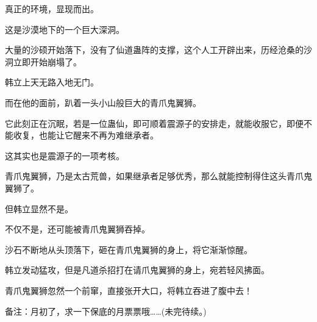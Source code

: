 \begin{this_body}
真正的环境，显现而出。

这是沙漠地下的一个巨大深洞。

大量的沙硕开始落下，没有了仙道蛊阵的支撑，这个人工开辟出来，历经沧桑的沙洞立即开始崩塌了。

韩立上天无路入地无门。

而在他的面前，趴着一头小山般巨大的青爪鬼翼狮。

它此刻正在沉眠，若是一位蛊仙，即可顺着震源子的安排走，就能收服它，即便不能收复，也能让它醒来不再为难继承者。

这其实也是震源子的一项考核。

青爪鬼翼狮，乃是太古荒兽，如果继承者足够优秀，那么就能控制得住这头青爪鬼翼狮了。

但韩立显然不是。

不仅不是，还可能被青爪鬼翼狮吞掉。

沙石不断地从头顶落下，砸在青爪鬼翼狮的身上，将它渐渐惊醒。

韩立发动猛攻，但是凡道杀招打在请爪鬼翼狮的身上，宛若轻风拂面。

青爪鬼翼狮忽然一个前窜，直接张开大口，将韩立吞进了腹中去！

备注：月初了，求一下保底的月票票哦……(未完待续。)

\end{this_body}

